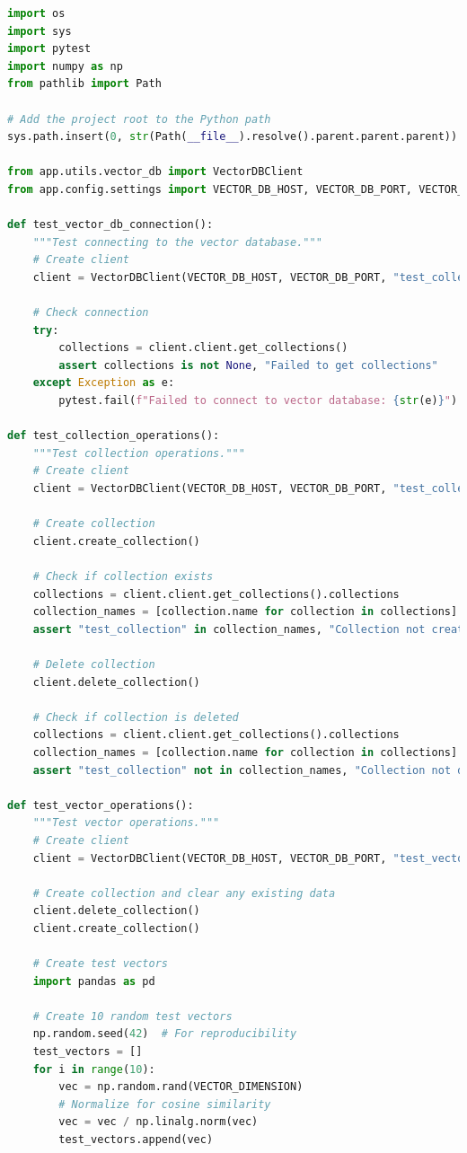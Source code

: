 \documentclass[
  screen,review,acmlarge]{acmart}
\begin{document}
\begin{lstlisting}[language=Python]
import os
import sys
import pytest
import numpy as np
from pathlib import Path

# Add the project root to the Python path
sys.path.insert(0, str(Path(__file__).resolve().parent.parent.parent))

from app.utils.vector_db import VectorDBClient
from app.config.settings import VECTOR_DB_HOST, VECTOR_DB_PORT, VECTOR_DIMENSION

def test_vector_db_connection():
    """Test connecting to the vector database."""
    # Create client
    client = VectorDBClient(VECTOR_DB_HOST, VECTOR_DB_PORT, "test_collection", VECTOR_DIMENSION)
    
    # Check connection
    try:
        collections = client.client.get_collections()
        assert collections is not None, "Failed to get collections"
    except Exception as e:
        pytest.fail(f"Failed to connect to vector database: {str(e)}")

def test_collection_operations():
    """Test collection operations."""
    # Create client
    client = VectorDBClient(VECTOR_DB_HOST, VECTOR_DB_PORT, "test_collection", VECTOR_DIMENSION)
    
    # Create collection
    client.create_collection()
    
    # Check if collection exists
    collections = client.client.get_collections().collections
    collection_names = [collection.name for collection in collections]
    assert "test_collection" in collection_names, "Collection not created"
    
    # Delete collection
    client.delete_collection()
    
    # Check if collection is deleted
    collections = client.client.get_collections().collections
    collection_names = [collection.name for collection in collections]
    assert "test_collection" not in collection_names, "Collection not deleted"

def test_vector_operations():
    """Test vector operations."""
    # Create client
    client = VectorDBClient(VECTOR_DB_HOST, VECTOR_DB_PORT, "test_vectors", VECTOR_DIMENSION)
    
    # Create collection and clear any existing data
    client.delete_collection()
    client.create_collection()
    
    # Create test vectors
    import pandas as pd
    
    # Create 10 random test vectors
    np.random.seed(42)  # For reproducibility
    test_vectors = []
    for i in range(10):
        vec = np.random.rand(VECTOR_DIMENSION)
        # Normalize for cosine similarity
        vec = vec / np.linalg.norm(vec)
        test_vectors.append(vec)
    

\end{lstlisting}
\end{document}
